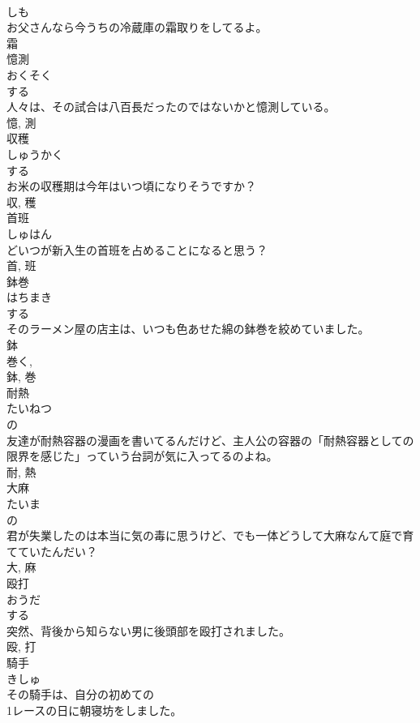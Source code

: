 \documentclass[8pt]{extreport}
\begin{document}
\begin{CJK}{UTF8}{min}
\\	しも	
\\	お父さんなら今うちの冷蔵庫の霜取りをしてるよ。	
\\	霜	
\\	憶測	
\\	おくそく	
\\	する 
\\	人々は、その試合は八百長だったのではないかと憶測している。	
\\	憶, 測	
\\	収穫	
\\	しゅうかく	
\\	する 
\\	お米の収穫期は今年はいつ頃になりそうですか？	
\\	収, 穫	
\\	首班	
\\	しゅはん	
\\	どいつが新入生の首班を占めることになると思う？	
\\	首, 班	
\\	鉢巻	
\\	はちまき	
\\	する 
\\	そのラーメン屋の店主は、いつも色あせた綿の鉢巻を絞めていました。	
\\	鉢 
\\	巻く, 
\\	鉢, 巻	
\\	耐熱	
\\	たいねつ	
\\	の 
\\	友達が耐熱容器の漫画を書いてるんだけど、主人公の容器の「耐熱容器としての限界を感じた」っていう台詞が気に入ってるのよね。	
\\	耐, 熱	
\\	大麻	
\\	たいま	
\\	の 
\\	君が失業したのは本当に気の毒に思うけど、でも一体どうして大麻なんて庭で育てていたんだい？	
\\	大, 麻	
\\	殴打	
\\	おうだ	
\\	する 
\\	突然、背後から知らない男に後頭部を殴打されました。	
\\	殴, 打	
\\	騎手	
\\	きしゅ	
\\	その騎手は、自分の初めての
\\	1レースの日に朝寝坊をしました。	

\end{CJK}
\end{document}
